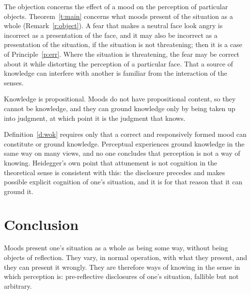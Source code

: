 \documentclass{situationist-preprint}
\begin{document}
\begin{reply}
The objection concerns the effect of a mood on the perception of particular objects. Theorem~\ref{t:main} concerns what moods present of the situation as a whole (Remark~\ref{r:object}). A fear that makes a neutral face look angry is incorrect as a presentation of the face, and it may also be incorrect as a presentation of the situation, if the situation is not threatening; then it is a case of Principle~\ref{p:err}. Where the situation is threatening, the fear may be correct about it while distorting the perception of a particular face. That a source of knowledge can interfere with another is familiar from the interaction of the senses.
\end{reply}

\begin{objection}
Knowledge is propositional. Moods do not have propositional content, so they cannot be knowledge, and they can ground knowledge only by being taken up into judgment, at which point it is the judgment that knows.
\end{objection}

\begin{reply}
Definition~\ref{d:wok} requires only that a correct and responsively formed mood can constitute or ground knowledge. Perceptual experiences ground knowledge in the same way on many views, and no one concludes that perception is not a way of knowing. Heidegger's own point that attunement is not cognition in the theoretical sense \citep[\S 29]{Heidegger1927} is consistent with this: the disclosure precedes and makes possible explicit cognition of one's situation, and it is for that reason that it can ground it.
\end{reply}

\section{Conclusion}

Moods present one's situation as a whole as being some way, without being objects of reflection. They vary, in normal operation, with what they present, and they can present it wrongly. They are therefore ways of knowing in the sense in which perception is: pre-reflective disclosures of one's situation, fallible but not arbitrary.
\end{document}
